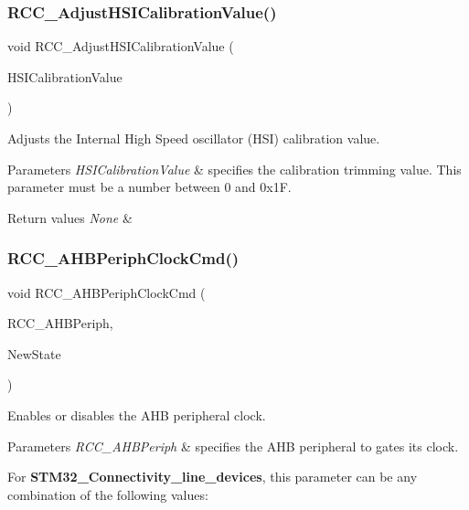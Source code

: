 \subsubsection{\texorpdfstring{RCC\_AdjustHSICalibrationValue()}{RCC\_AdjustHSICalibrationValue()}}
{\footnotesize\ttfamily void R\+C\+C\+\_\+\+Adjust\+H\+S\+I\+Calibration\+Value (\begin{DoxyParamCaption}\item[{uint8\+\_\+t}]{H\+S\+I\+Calibration\+Value }\end{DoxyParamCaption})}



Adjusts the Internal High Speed oscillator (H\+SI) calibration value. 


\begin{DoxyParams}{Parameters}
{\em H\+S\+I\+Calibration\+Value} & specifies the calibration trimming value. This parameter must be a number between 0 and 0x1F. \\
\hline
\end{DoxyParams}

\begin{DoxyRetVals}{Return values}
{\em None} & \\
\hline
\end{DoxyRetVals}
\mbox{\label{group___r_c_c___exported___functions_gae0b30d8598b8393bdba9c3fefba3a968}} 
\subsubsection{\texorpdfstring{RCC\_AHBPeriphClockCmd()}{RCC\_AHBPeriphClockCmd()}}
{\footnotesize\ttfamily void R\+C\+C\+\_\+\+A\+H\+B\+Periph\+Clock\+Cmd (\begin{DoxyParamCaption}\item[{uint32\+\_\+t}]{R\+C\+C\+\_\+\+A\+H\+B\+Periph,  }\item[{\mbox{\hyperlink{group___exported__types_gac9a7e9a35d2513ec15c3b537aaa4fba1}{Functional\+State}}}]{New\+State }\end{DoxyParamCaption})}



Enables or disables the A\+HB peripheral clock. 


\begin{DoxyParams}{Parameters}
{\em R\+C\+C\+\_\+\+A\+H\+B\+Periph} & specifies the A\+HB peripheral to gates its clock.\\
\hline
\end{DoxyParams}
For {\bfseries{S\+T\+M32\+\_\+\+Connectivity\+\_\+line\+\_\+devices}}, this parameter can be any combination of the following values\+:

